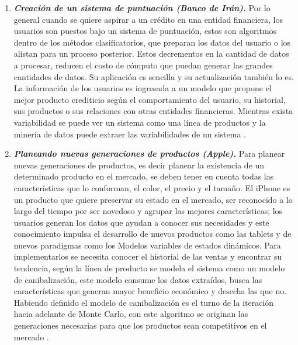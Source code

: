 \begin{enumerate}
\item \textbf{\textit{Creación de un sistema de puntuación (Banco de Irán).}} Por lo general cuando se quiere aspirar a un crédito en una entidad financiera, los usuarios son puestos bajo un sistema de puntuación, estos son algoritmos dentro de los métodos clasificatorios, que preparan los datos del usuario o los alistan para un proceso posterior. Estos decrementos en la cantidad de datos a procesar, reducen el costo de cómputo que puedan generar las grandes cantidades de datos. Su aplicación es sencilla y su actualización también lo es. La información de los usuarios es ingresada a un modelo que propone el mejor producto crediticio según el comportamiento del usuario, su historial, sus productos o sus relaciones con otras entidades financieras. Mientras exista variabilidad se puede ver un sistema como una línea de productos y la minería de datos puede extraer las variabilidades de un sistema \cite{Koutanaei2015}.

\item \textbf{\textit{Planeando nuevas generaciones de productos (Apple).}} Para planear nuevas generaciones de productos, es decir planear la existencia de un determinado producto en el mercado, se deben tener en cuenta todas las características que lo conforman, el color, el precio y el tamaño.  El iPhone es un producto que quiere preservar su estado en el mercado, ser reconocido a lo largo del tiempo por ser novedoso y agrupar las mejores características; los usuarios generan los datos que ayudan a conocer sus necesidades y este conocimiento impulsa el desarrollo de nuevos productos como las tablets y de nuevos paradigmas como los Modelos variables de estados dinámicos.  Para implementarlos se necesita conocer el historial de las ventas y encontrar su tendencia, según la línea de producto se modela el sistema como un modelo de canibalización, este modelo consume los datos extraídos, busca las características que generan mayor beneficio económico y desecha las que no. Habiendo definido el modelo de canibalización es el turno de la iteración hacia adelante de Monte Carlo, con este algoritmo se originan las generaciones necesarias para que los productos sean competitivos en el mercado \cite{Lin2013}.


\end{enumerate}
